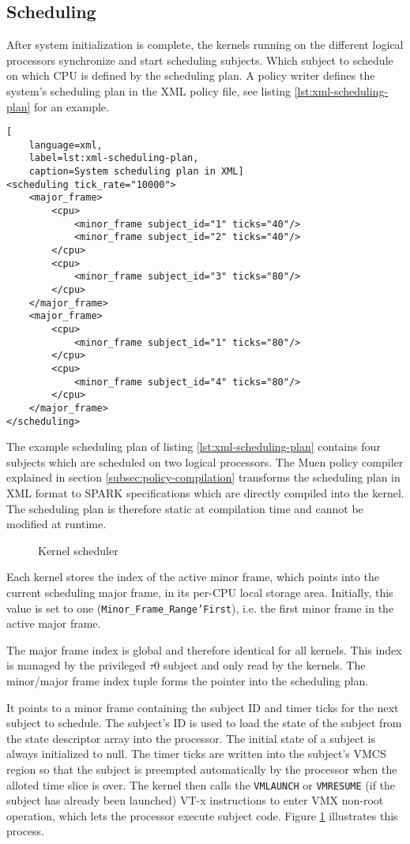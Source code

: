 \subsection{Scheduling}\label{subsec:scheduling}
After system initialization is complete, the kernels running on the different
logical processors synchronize and start scheduling subjects. Which subject to
schedule on which CPU is defined by the scheduling plan. A policy writer defines
the system's scheduling plan in the XML policy file, see listing
\ref{lst:xml-scheduling-plan} for an example.

\begin{lstlisting}[
	language=xml,
	label=lst:xml-scheduling-plan,
	caption=System scheduling plan in XML]
<scheduling tick_rate="10000">
	<major_frame>
		<cpu>
			<minor_frame subject_id="1" ticks="40"/>
			<minor_frame subject_id="2" ticks="40"/>
		</cpu>
		<cpu>
			<minor_frame subject_id="3" ticks="80"/>
		</cpu>
	</major_frame>
	<major_frame>
		<cpu>
			<minor_frame subject_id="1" ticks="80"/>
		</cpu>
		<cpu>
			<minor_frame subject_id="4" ticks="80"/>
		</cpu>
	</major_frame>
</scheduling>
\end{lstlisting}

The example scheduling plan of listing \ref{lst:xml-scheduling-plan} contains
four subjects which are scheduled on two logical processors. The Muen policy
compiler explained in section \ref{subsec:policy-compilation} transforms the
scheduling plan in XML format to SPARK specifications which are directly
compiled into the kernel. The scheduling plan is therefore static at compilation
time and cannot be modified at runtime.

\begin{figure}[h]
	\centering
	
	\caption{Kernel scheduler}
	\label{fig:kernel-scheduler}
\end{figure}

Each kernel stores the index of the active minor frame, which points into the
current scheduling major frame, in its per-CPU local storage area. Initially,
this value is set to one (\texttt{Minor\_Frame\_Range'First}), i.e. the first
minor frame in the active major frame.

The major frame index is global and therefore identical for all kernels. This
index is managed by the privileged $\tau$0 subject and only read by the kernels.
The minor/major frame index tuple forms the pointer into the scheduling plan.

It points to a minor frame containing the subject ID and timer ticks for the
next subject to schedule. The subject's ID is used to load the state of the
subject from the state descriptor array into the processor. The initial state of
a subject is always initialized to null. The timer ticks are written into the
subject's VMCS region so that the subject is preempted automatically by the
processor when the alloted time slice is over. The kernel then calls the
\texttt{VMLAUNCH} or \texttt{VMRESUME} (if the subject has already been
launched) VT-x instructions to enter VMX non-root operation, which lets the
processor execute subject code. Figure \ref{fig:kernel-scheduler} illustrates
this process.

